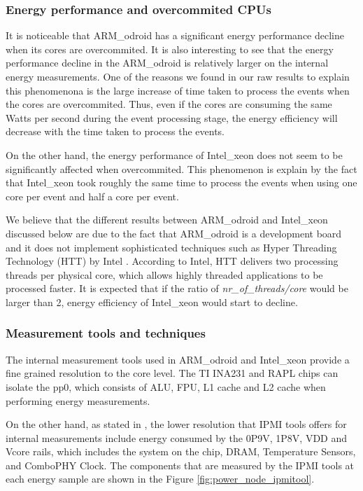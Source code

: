 \subsubsection*{Energy performance and overcommited CPUs}

It is noticeable that ARM\_odroid has a significant energy performance decline when its cores are overcommited. It is also interesting to see that the energy performance decline in the ARM\_odroid is relatively larger on the internal energy measurements. One of the reasons we found in our raw results to explain this phenomenona is the large increase of time taken to process the events when the cores are overcommited. Thus, even if the cores are consuming the same Watts per second during the event processing stage, the energy efficiency will decrease with the time taken to process the events.  

On the other hand, the energy performance of Intel\_xeon does not seem to be significantly affected when overcommited. This phenomenon is explain by the fact that Intel\_xeon took roughly the same time to process the events when using one core per event and half a core per event.

We believe that the different results between ARM\_odroid and Intel\_xeon discussed below are due to the fact that ARM\_odroid is a development board and it does not implement sophisticated techniques such as Hyper Threading Technology (HTT) by Intel \cite{HTT}. According to Intel, HTT delivers two processing threads per physical core, which allows highly threaded applications to be processed faster. It is expected that if the ratio of  \textit{nr\_of\_threads/core} would be larger than 2, energy efficiency of Intel\_xeon would start to decline.  

\subsubsection*{Measurement tools and techniques}

The internal measurement tools used in ARM\_odroid and Intel\_xeon provide a fine grained resolution to the core level. The TI INA231 and RAPL chips can isolate the pp0, which consists of ALU, FPU, L1 cache and L2 cache when performing energy measurements. 

On the other hand, as stated in \cite{IPMI_resolution}, the lower resolution that IPMI tools offers for internal measurements include energy consumed by the 0P9V, 1P8V, VDD and Vcore rails, which includes the system on the chip, DRAM, Temperature Sensors, and ComboPHY Clock. The components that are measured by the IPMI tools at each energy sample are shown in the Figure \ref{fig:power_node_ipmitool}.

